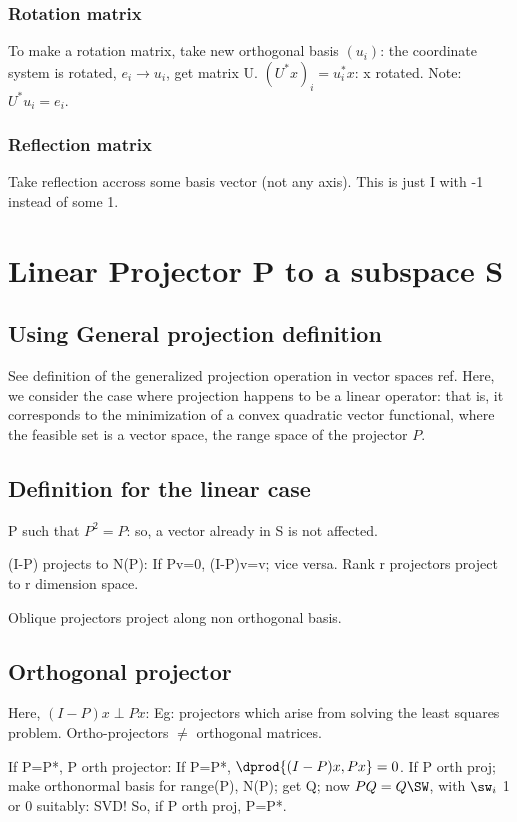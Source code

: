 \documentclass[oneside, article]{memoir}
\begin{document}
\subsubsection{Rotation matrix}
To make a rotation matrix, take new orthogonal basis $(u_i)$: the coordinate system is rotated, $e_i \to u_i$, get matrix U. $(U^{*}x)_i = u_i^{*}x$: x rotated. Note: $U^{*}u_i  = e_i$.

\subsubsection{Reflection matrix}
Take reflection accross some basis vector (not any axis). This is just I with -1 instead of some 1.

\section{Linear Projector P to a subspace S}
\subsection{Using General projection definition}
See definition of the generalized projection operation in vector spaces ref. Here, we consider the case where projection happens to be a linear operator: that is, it corresponds to the minimization of a convex quadratic vector functional, where the feasible set is a vector space, the range space of the projector $P$.

\subsection{Definition for the linear case}
P such that $P^{2}=P$: so, a vector already in S is not affected.

(I-P) projects to N(P): If Pv=0, (I-P)v=v; vice versa. Rank r projectors project to r dimension space.

Oblique projectors project along non orthogonal basis.

\subsection{Orthogonal projector}
Here, $(I-P)x \perp Px$: Eg: projectors which arise from solving the least squares problem. Ortho-projectors $\neq$ orthogonal matrices.

If P=P*, P orth projector: If P=P*, $\dprod{(I-P)x, Px} = 0$. If P orth proj; make orthonormal basis for range(P), N(P); get Q; now $PQ= Q\SW$, with $\sw_{i}$ 1 or 0 suitably: SVD! So, if P orth proj, P=P*.
\end{document}
